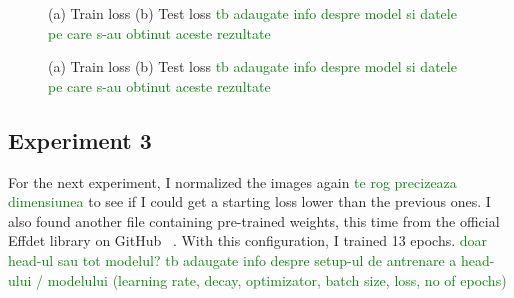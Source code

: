 \begin{figure}[!ht]
    \caption{(a) Train loss (b) Test loss
    \textcolor{green}{tb adaugate info despre model si datele pe care s-au obtinut aceste rezultate}
    }
    \label{fig:fig25}
\end{figure}

\begin{figure}[!ht]
    \caption{(a) Train loss (b) Test loss
    \textcolor{green}{tb adaugate info despre model si datele pe care s-au obtinut aceste rezultate}
    }
    \label{fig:fig26}
\end{figure}

\subsection{Experiment 3}

For the next experiment, I normalized the images again 
\textcolor{green}{te rog precizeaza dimensiunea} 
to see if I could get a starting loss lower than the previous ones. I also found another file containing pre-trained weights, this time from the official Effdet library on GitHub ~\cite{link7}. With this configuration, I trained 13 epochs. 
\textcolor{green}{doar head-ul sau tot modelul?}  
\textcolor{green}{tb adaugate info despre setup-ul de antrenare a head-ului / modelului (learning rate, decay, optimizator, batch size, loss, no of epochs)}

